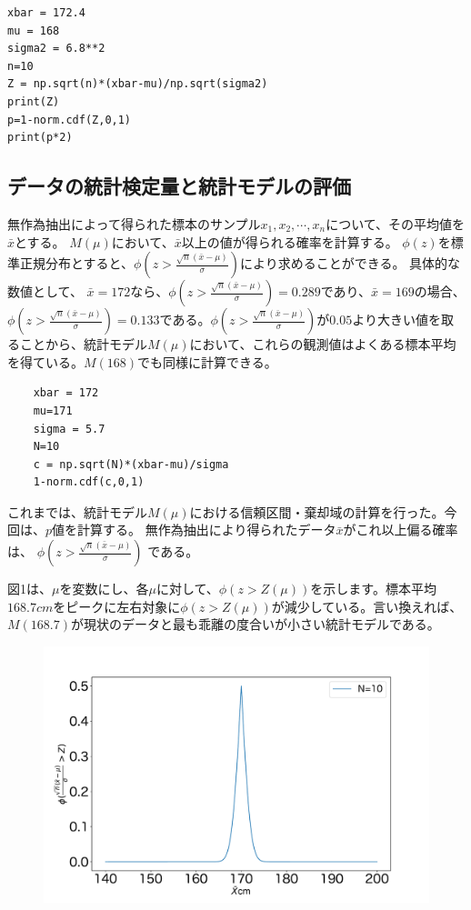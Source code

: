 \begin{lstlisting}
xbar = 172.4
mu = 168
sigma2 = 6.8**2
n=10
Z = np.sqrt(n)*(xbar-mu)/np.sqrt(sigma2)
print(Z)
p=1-norm.cdf(Z,0,1)
print(p*2)
\end{lstlisting}

\subsection{データの統計検定量と統計モデルの評価}
無作為抽出によって得られた標本のサンプル$x_1,x_2,\cdots,x_n$について、その平均値を$\bar{x}$とする。
$M(\mu)$において、$\bar{x}$以上の値が得られる確率を計算する。
$\phi(z)$を標準正規分布とすると、$\phi(z>\frac{\sqrt{n}(\bar{x}-\mu)}{\sigma})$により求めることができる。
具体的な数値として、
$\bar{x}=172$なら、$\phi(z>\frac{\sqrt{n}(\bar{x}-\mu)}{\sigma}) = 0.289$であり、$\bar{x}=169$の場合、$\phi(z>\frac{\sqrt{n}(\bar{x}-\mu)}{\sigma}) = 0.133$である。$\phi(z>\frac{\sqrt{n}(\bar{x}-\mu)}{\sigma})$が$0.05$より大きい値を取ることから、統計モデル$M(\mu)$において、これらの観測値はよくある標本平均を得ている。$M(168)$でも同様に計算できる。

\begin{lstlisting}
    xbar = 172
    mu=171
    sigma = 5.7
    N=10
    c = np.sqrt(N)*(xbar-mu)/sigma
    1-norm.cdf(c,0,1)
\end{lstlisting}





これまでは、統計モデル$M(\mu)$における信頼区間・棄却域の計算を行った。今回は、$p$値を計算する。
無作為抽出により得られたデータ$\bar{x}$がこれ以上偏る確率は、
$\phi(z>\frac{\sqrt{n}(\bar{x}-\mu)}{\sigma})$
である。

図1は、$\mu$を変数にし、各$\mu$に対して、$\phi(z>Z(\mu))$を示します。標本平均$168.7cm$をピークに左右対象に$\phi(z>Z(\mu))$が減少している。言い換えれば、$M(168.7)$が現状のデータと最も乖離の度合いが小さい統計モデルである。
\begin{figure}
\begin{center}
   \includegraphics[width=15cm]{./image/04_/p_cm.pdf}
 \end{center}
\end{figure}


